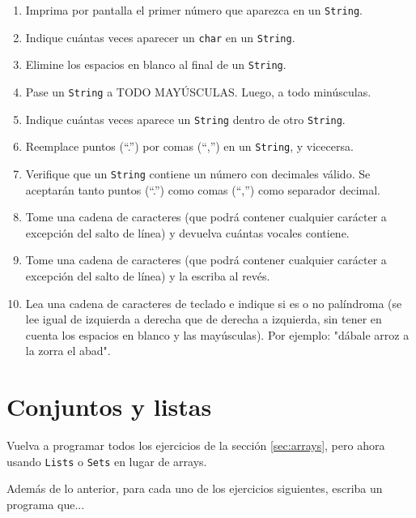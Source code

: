 \documentclass[a4paper]{article}
\newcommand{\code}[1]{\texttt{#1}}
\begin{document}
\begin{enumerate}
    \item Imprima por pantalla el primer número que aparezca en un \code{String}.
    \item Indique cuántas veces aparecer un \code{char} en un \code{String}.
    \item Elimine los espacios en blanco al final de un \code{String}.
    \item Pase un \code{String} a TODO MAYÚSCULAS. Luego, a todo minúsculas.
    \item Indique cuántas veces aparece un \code{String} dentro de otro \code{String}.
    \item Reemplace puntos (``.'') por comas (``,'') en un \code{String}, y vicecersa.
    \item Verifique que un \code{String} contiene un número con decimales válido. Se aceptarán tanto puntos (``.'') como comas (``,'') como separador decimal.
    \item Tome una cadena de caracteres (que podrá contener cualquier carácter a excepción del salto de línea) y devuelva cuántas vocales contiene.
    \item Tome una cadena de caracteres (que podrá contener cualquier carácter a excepción del salto de línea) y la escriba al revés.
    \item Lea una cadena de caracteres de teclado e indique si es o no palíndroma (se lee igual de izquierda a derecha que de derecha a izquierda, sin tener en cuenta los espacios en blanco y las mayúsculas). Por ejemplo: "dábale arroz a la zorra el abad".

\end{enumerate}

\section{Conjuntos y listas}
\label{sec:listas}

Vuelva a programar todos los ejercicios de la sección \ref{sec:arrays}, pero ahora usando \code{Lists} o \code{Sets} en lugar de arrays.

Además de lo anterior, para cada uno de los ejercicios siguientes, escriba un programa que...
\end{document}
